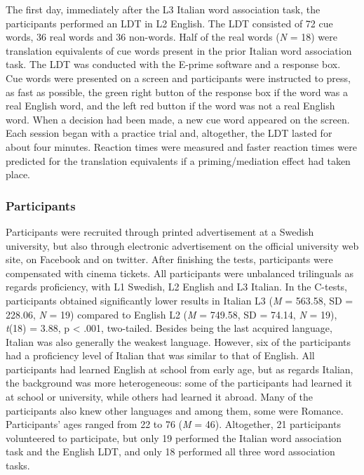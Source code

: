 \documentclass[output=paper,colorlinks,citecolor=brown,nonflat]{langsci/langscibook}
\begin{document}
The first day, immediately after the L3 Italian word association task, the participants performed an LDT in L2 English. The LDT consisted of 72 cue words, 36 real words and 36 non-words. Half of the real words (\textit{N} = 18) were translation equivalents of cue words present in the prior Italian word association task. The LDT was conducted with the E-prime software and a response box. Cue words were presented on a screen and participants were instructed to press, as fast as possible, the green right button of the response box if the word was a real English word, and the left red button if the word was not a real English word. When a decision had been made, a new cue word appeared on the screen. Each session began with a practice trial and, altogether, the LDT lasted for about four minutes. Reaction times were measured and faster reaction times were predicted for the translation equivalents if a priming/mediation effect had taken place.

\subsubsection{Participants}\label{sec:gudmundson:2.2.2}

Participants were recruited through printed advertisement at a Swedish university, but also through electronic advertisement on the official university web site, on Facebook and on twitter. After finishing the tests, participants were compensated with cinema tickets. All participants were unbalanced trilinguals as regards proficiency, with L1 Swedish, L2 English and L3 Italian. In the C-tests, participants obtained significantly lower results in Italian L3 (\textit{M} = 563.58, SD = 228.06, \textit{N} = 19) compared to English L2 (\textit{M} = 749.58, SD = 74.14, \textit{N} = 19), \textit{t}(18) = 3.88, p < .001, two-tailed. Besides being the last acquired language, Italian was also generally the weakest language. However, six of the participants had a proficiency level of Italian that was similar to that of English. All participants had learned English at school from early age, but as regards Italian, the background was more heterogeneous: some of the participants had learned it at school or university, while others had learned it abroad. Many of the participants also knew other languages and among them, some were Romance. Participants’ ages ranged from 22 to 76 (\textit{M} = 46). Altogether, 21 participants volunteered to participate, but only 19 performed the Italian word association task and the English LDT, and only 18 performed all three word association tasks.
\end{document}
